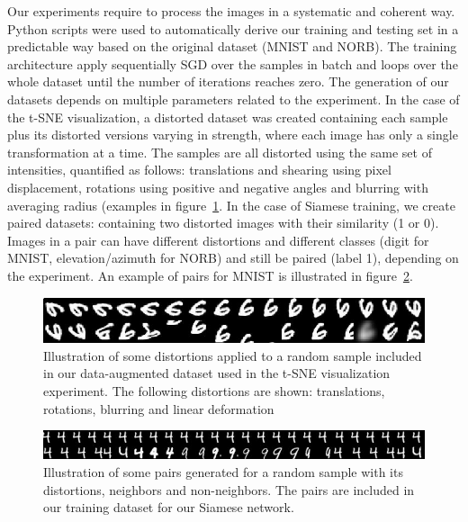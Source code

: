 \documentclass[a4paper,12pt]{report}
\begin{document}
Our experiments require to process the images in a systematic and coherent way.
Python scripts were used to automatically derive our training and testing set in a predictable way based on the original dataset (MNIST and NORB).
The training architecture apply sequentially SGD over the samples in batch and loops over the whole dataset until the number of iterations reaches zero.
The generation of our datasets depends on multiple parameters related to the experiment.
In the case of the t-SNE visualization, a distorted dataset was created containing each sample plus its distorted versions varying in strength, where each image has only a single transformation at a time.
The samples are all distorted using the same set of intensities, quantified as follows: translations and shearing using pixel displacement, rotations using positive and negative angles and blurring with averaging radius (examples in figure~\ref{fig:mnist_transfo_tsne}.
In the case of Siamese training, we create paired datasets: containing two distorted images with their similarity (1 or 0).
Images in a pair can have different distortions and different classes (digit for MNIST, elevation/azimuth for NORB) and still be paired (label 1), depending on the experiment.
An example of pairs for MNIST is illustrated in figure~\ref{fig:mnist_pairs}.

\begin{figure}[t]
    \begin{center}
        \includegraphics{thesis_figures/mnist_transfo_tsne.jpg}
    \end{center}
    \caption{Illustration of some distortions applied to a random sample included in our data-augmented dataset used in the t-SNE visualization experiment. The following distortions are shown: translations, rotations, blurring and linear deformation}
    \label{fig:mnist_transfo_tsne}
\end{figure}

\begin{figure}[t]
    \begin{center}
        \includegraphics{thesis_figures/mnist_pairs.jpg}
    \end{center}
    \caption{Illustration of some pairs generated for a random sample with its distortions, neighbors and non-neighbors. The pairs are included in our training dataset for our Siamese network.}
    \label{fig:mnist_pairs}
\end{figure}
\end{document}
